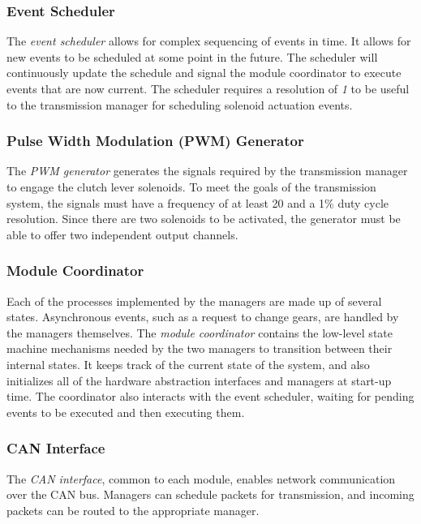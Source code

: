 \subsubsection{Event Scheduler}

The \emph{event scheduler} allows for complex sequencing of events in time. It allows for new events to be scheduled at some point in the future.
The scheduler will continuously update the schedule and signal the module coordinator to execute events that are now current. The scheduler requires a resolution of \emph{1}{\milli\second} to be useful to the transmission manager for scheduling solenoid actuation events.

\subsubsection{Pulse Width Modulation (PWM) Generator}

The \emph{PWM generator} generates the signals required by the transmission manager to engage the clutch lever solenoids. To meet the goals of the transmission system, the signals must have a frequency of at least \unit{20}{\hertz} and a 1\% duty cycle resolution. Since there are two solenoids to be activated, the generator must be able to offer two independent output channels.

\subsubsection{Module Coordinator}

Each of the processes implemented by the managers are made up of several states. Asynchronous events, such as a request to change gears, are handled by the managers themselves. The \emph{module coordinator} contains the low-level state machine mechanisms needed by the two managers to transition between their internal states. It keeps track of the current state of the system, and also initializes all of the hardware abstraction interfaces and managers at start-up time. The coordinator also interacts with the event scheduler, waiting for pending events to be executed and then executing them.

\subsubsection{CAN Interface}

The \emph{CAN interface}, common to each module, enables network communication over the CAN bus. Managers can schedule packets for transmission, and incoming packets can be routed to the appropriate manager.

